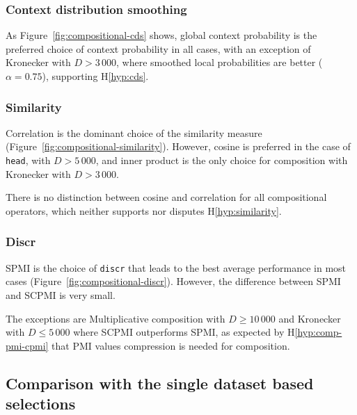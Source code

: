 \subsubsection{Context distribution smoothing}
\label{sec:cont-distr-smooth-compositional}



As Figure~\ref{fig:compositional-cds} shows, global context probability is the preferred choice of context probability in all cases, with an exception of Kronecker with $D > 3\,000$, where smoothed local probabilities are better ($\alpha = 0.75$), supporting H\ref{hyp:cds}.

\subsubsection{Similarity}
\label{sec:similarity-compositional}

Correlation is the dominant choice of the similarity measure (Figure~\ref{fig:compositional-similarity}). However, cosine is preferred in the case of \texttt{head}, with $D > 5\,000$, and inner product is the only choice for composition with Kronecker with $D > 3\,000$.

There is no distinction between cosine and correlation for all compositional operators, which neither supports nor disputes H\ref{hyp:similarity}.
%
%

\subsubsection{Discr}
\label{sec:discr-compositional}



SPMI is the choice of \texttt{discr} that leads to the best average performance in most cases (Figure~\ref{fig:compositional-discr}). However, the difference between SPMI and SCPMI is very small.

The exceptions are Multiplicative composition with $D \geq 10\,000$ and Kronecker with $D \leq 5\,000$ where SCPMI outperforms SPMI, as expected by H\ref{hyp:comp-pmi-cpmi} that PMI values compression is needed for composition.

\subsection{Comparison with the single dataset based selections}
\label{sec:comp-with-single-comp}

